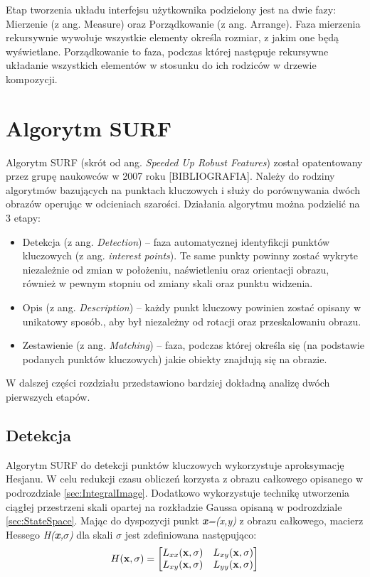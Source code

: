 Etap tworzenia układu interfejsu użytkownika podzielony jest na dwie fazy: Mierzenie (z ang. Measure) oraz Porządkowanie (z ang. Arrange). Faza mierzenia rekursywnie wywołuje wszystkie elementy określa rozmiar, z jakim one będą wyświetlane. Porządkowanie to faza, podczas której następuje rekursywne układanie wszystkich elementów w stosunku do ich rodziców w drzewie kompozycji. 


\section{Algorytm SURF}
Algorytm SURF (skrót od ang. \textit{Speeded Up Robust Features}) został opatentowany przez grupę naukowców w 2007 roku [BIBLIOGRAFIA]. Należy do rodziny algorytmów bazujących na punktach kluczowych i służy do porównywania dwóch obrazów operując w odcieniach szarości. Działania algorytmu można podzielić na 3 etapy:

\begin{itemize}
	\item Detekcja (z ang. \textit{Detection}) – faza automatycznej identyfikcji punktów kluczowych (z ang. \textit{interest points}). Te same punkty powinny zostać wykryte niezależnie od zmian w położeniu, naświetleniu oraz orientacji obrazu, również w pewnym stopniu od zmiany skali oraz punktu widzenia. 
	\item Opis (z ang. \textit{Description}) – każdy punkt kluczowy powinien zostać opisany w unikatowy sposób., aby był niezależny od rotacji oraz przeskalowaniu obrazu.
	\item Zestawienie (z ang. \textit{Matching}) – faza, podczas której określa się (na podstawie podanych punktów kluczowych) jakie obiekty znajdują się na obrazie. 
\end{itemize}

W dalszej części rozdziału przedstawiono bardziej dokładną analizę dwóch pierwszych etapów.

\subsection{Detekcja}
Algorytm SURF do detekcji punktów kluczowych wykorzystuje aproksymację Hesjanu. W celu redukcji czasu obliczeń korzysta z obrazu całkowego opisanego w podrozdziale \ref{sec:IntegralImage}. Dodatkowo wykorzystuje technikę utworzenia ciągłej przestrzeni skali opartej na rozkładzie Gaussa opisaną w podrozdziale \ref{sec:StateSpace}.
Mając do dyspozycji punkt \textit{\textbf{x}=(x,y)} z obrazu całkowego, macierz Hessego \textit{H(\textbf{x},$\sigma$)} dla skali $\sigma$ jest zdefiniowana następująco:
\begin{equation}\textsl{}
H(\textbf{x},\sigma) = 
\begin{bmatrix}
L_{xx}(\textbf{x},\sigma) & L_{xy}(\textbf{x},\sigma) \\ L_{xy}(\textbf{x},\sigma) & L_{yy}(\textbf{x},\sigma)
\end{bmatrix}
\end{equation}


